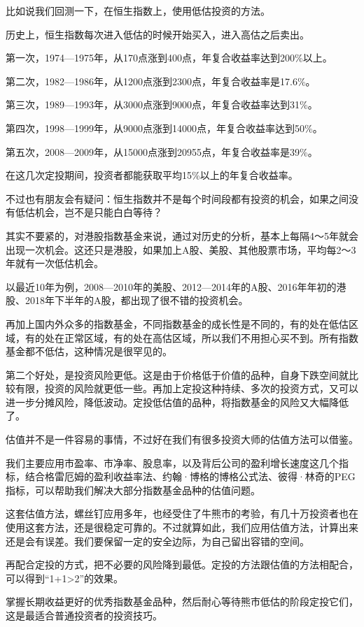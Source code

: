 比如说我们回测一下，在恒生指数上，使用低估投资的方法。

历史上，恒生指数每次进入低估的时候开始买入，进入高估之后卖出。

第一次，1974—1975年，从170点涨到400点，年复合收益率达到200\%以上。

第二次，1982—1986年，从1200点涨到2300点，年复合收益率是17.6\%。

第三次，1989—1993年，从3000点涨到9000点，年复合收益率达到31\%。

第四次，1998—1999年，从9000点涨到14000点，年复合收益率达到50\%。

第五次，2008—2009年，从15000点涨到20955点，年复合收益率是39\%。

在这几次定投期间，投资者都能获取平均15\%以上的年复合收益率。

不过也有朋友会有疑问：恒生指数并不是每个时间段都有投资的机会，如果之间没有低估机会，岂不是只能白白等待？

其实不要紧的，对港股指数基金来说，通过对历史的分析，基本上每隔4～5年就会出现一次机会。这还只是港股，如果加上A股、美股、其他股票市场，平均每2～3年就有一次低估机会。

以最近10年为例，2008—2010年的美股、2012—2014年的A股、2016年年初的港股、2018年下半年的A股，都出现了很不错的投资机会。

再加上国内外众多的指数基金，不同指数基金的成长性是不同的，有的处在低估区域，有的处在正常区域，有的处在高估区域，所以我们不用担心买不到。所有指数基金都不低估，这种情况是很罕见的。

第二个好处，是投资风险更低。这是由于价格低于价值的品种，自身下跌空间就比较有限，投资的风险就更低一些。再加上定投这种持续、多次的投资方式，又可以进一步分摊风险，降低波动。定投低估值的品种，将指数基金的风险又大幅降低了。

估值并不是一件容易的事情，不过好在我们有很多投资大师的估值方法可以借鉴。

我们主要应用市盈率、市净率、股息率，以及背后公司的盈利增长速度这几个指标，结合格雷厄姆的盈利收益率法、约翰·博格的博格公式法、彼得·林奇的PEG指标，可以帮助我们解决大部分指数基金品种的估值问题。

这套估值方法，螺丝钉应用多年，也经受住了牛熊市的考验，有几十万投资者也在使用这套方法，还是很稳定可靠的。不过就算如此，我们应用估值方法，计算出来还是会有误差。我们要保留一定的安全边际，为自己留出容错的空间。

再配合定投的方式，把不必要的风险降到最低。定投的方法跟估值的方法相配合，可以得到“1+1>2”的效果。

掌握长期收益更好的优秀指数基金品种，然后耐心等待熊市低估的阶段定投它们，这是最适合普通投资者的投资技巧。

